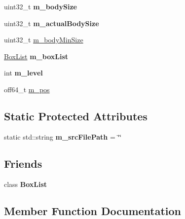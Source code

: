 \begin{DoxyCompactItemize}
uint32\+\_\+t {\bfseries m\+\_\+body\+Size}
\item 
\mbox{\label{classmp4_parser_1_1_box_a3ef69b1a4ce14466c47f0e5cee7004e9}} 
uint32\+\_\+t {\bfseries m\+\_\+actual\+Body\+Size}
\item 
uint32\+\_\+t \mbox{\hyperlink{classmp4_parser_1_1_box_afc4a3304b9cd22cc77ed988ff03a9cfc}{m\+\_\+body\+Min\+Size}}
\item 
\mbox{\label{classmp4_parser_1_1_box_a90408f1580f539a7d25465faba8357c6}} 
\mbox{\hyperlink{classmp4_parser_1_1_box_list}{Box\+List}} {\bfseries m\+\_\+box\+List}
\item 
\mbox{\label{classmp4_parser_1_1_box_af227e8342b3df86804c3b029eee499ab}} 
int {\bfseries m\+\_\+level}
\item 
off64\+\_\+t \mbox{\hyperlink{classmp4_parser_1_1_box_a795d4a890b967c920cb922c51606e3c3}{m\+\_\+pos}}
\end{DoxyCompactItemize}
\subsection*{Static Protected Attributes}
\begin{DoxyCompactItemize}
\item 
\mbox{\label{classmp4_parser_1_1_box_a094d7dbc2341a4fa1c22871a87e90bc8}} 
static std\+::string {\bfseries m\+\_\+src\+File\+Path} = \char`\"{}\char`\"{}
\end{DoxyCompactItemize}
\subsection*{Friends}
\begin{DoxyCompactItemize}
\item 
\mbox{\label{classmp4_parser_1_1_box_ae042c94909df0337db5ae953719dabe2}} 
class {\bfseries Box\+List}
\end{DoxyCompactItemize}


\subsection{Member Function Documentation}
\mbox{\label{classmp4_parser_1_1_box_a1dc6d8d489a5099e167cdd7a1a592ea2}} 
